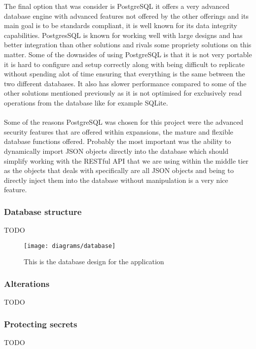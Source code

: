 The final option that was consider is PostgreSQL it offers a very advanced database engine with advanced features not offered by the other offerings and its main goal is to be standards compliant, it is well known for its data integrity capabilities. PostgresSQL is known for working well with large designs and has better integration than other solutions and rivals some propriety solutions on this matter. Some of the downsides of using PostgreSQL is that it is not very portable it is hard to configure and setup correctly along with being difficult to replicate without spending alot of time ensuring that everything is the same between the two different databases. It also has slower performance compared to some of the other solutions mentioned previously as it is not optimised for exclusively read operations from the database like for example SQLite.\\
\\
Some of the reasons PostgreSQL was chosen for this project were the advanced security features that are offered within expansions, the mature and flexible database functions offered. Probably the most important was the ability to dynamically import JSON objects directly into the database which should simplify working with the RESTful API that we are using within the middle tier as the objects that deals with specifically are all JSON objects and being to directly inject them into the database without manipulation is a very nice feature. 

\subsubsection*{Database structure}

{TODO}

\begin{figure}[H]
    \centering
    \texttt{[image: diagrams/database]}
    \caption{This is the database design for the application}
    \label{fig:diagram_database_image}
\end{figure} 
\noindent

\subsubsection*{Alterations}

{TODO}

\subsubsection*{Protecting secrets}
\label{sec:database_security}

{TODO}